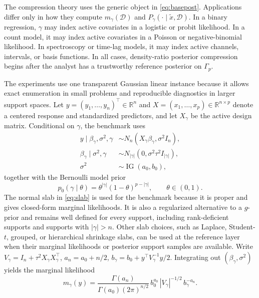 \documentclass[twoside,11pt]{article}
\newcommand{\D}{\mathcal{D}}
\newcommand{\R}{\mathbb{R}}
\begin{document}
The compression theory uses the generic object in \eqref{eq:basepost}. Applications differ only in how they compute \(m_\gamma(\D)\) and \(P_\gamma(\cdot\mid\tilde x,\D)\). In a binary regression, \(\gamma\) may index active covariates in a logistic or probit likelihood. In a count model, it may index active covariates in a Poisson or negative-binomial likelihood. In spectroscopy or time-lag models, it may index active channels, intervals, or basis functions. In all cases, density-ratio posterior compression begins after the analyst has a trustworthy reference posterior on \(\Gamma_p\).

The experiments use one transparent Gaussian linear instance because it allows exact enumeration in small problems and reproducible diagnostics in larger support spaces. Let \(y=(y_1,\dots,y_n)^\top\in\R^n\) and \(X=(x_1,\dots,x_p)\in\R^{n\times p}\) denote a centered response and standardized predictors, and let \(X_\gamma\) be the active design matrix. Conditional on \(\gamma\), the benchmark uses
\begin{align}
y \mid \beta_\gamma,\sigma^2,\gamma &\sim N_n(X_\gamma \beta_\gamma,\sigma^2 I_n), \label{eq:like} \\
\beta_\gamma \mid \sigma^2,\gamma &\sim N_{|\gamma|}(0,\sigma^2 \tau^2 I_{|\gamma|}), \label{eq:slab} \\
\sigma^2 &\sim \operatorname{IG}(a_0,b_0), \label{eq:ig}
\end{align}
together with the Bernoulli model prior
\begin{equation}
p_0(\gamma \mid \theta) = \theta^{|\gamma|}(1-\theta)^{p-|\gamma|}, \qquad \theta \in (0,1). \label{eq:modelprior}
\end{equation}
The normal slab in \eqref{eq:slab} is used for the benchmark because it is proper and gives closed-form marginal likelihoods. It is also a regularized alternative to a \(g\)-prior and remains well defined for every support, including rank-deficient supports and supports with \(|\gamma|>n\). Other slab choices, such as Laplace, Student-\(t\), grouped, or hierarchical shrinkage slabs, can be used at the reference layer when their marginal likelihoods or posterior support samples are available. Write $V_\gamma=I_n+\tau^2X_\gamma X_\gamma^\top$, $a_n=a_0+n/2$, $b_\gamma=b_0+y^\top V_\gamma^{-1}y/2$. Integrating out $(\beta_\gamma,\sigma^2)$ yields the marginal likelihood
\begin{equation}
m_\gamma(y) = \frac{\Gamma(a_n)}{\Gamma(a_0)(2\pi)^{n/2}} \, b_0^{a_0} \, |V_\gamma|^{-1/2} \, b_\gamma^{-a_n}. \label{eq:marginal}
\end{equation}
\end{document}
